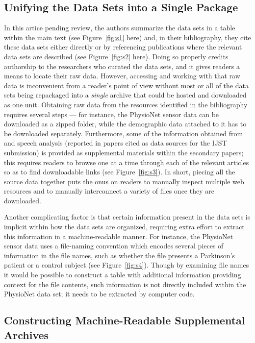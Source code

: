 \documentclass[11pt,letterpaper]{article}
\newcommand{\MRI}{\resizebox{!}{7pt}{\AcronymText{MRI}}}
\newcommand{\textscc}[1]{{\color{orr!35!black}{{%
						\fontfamily{Cabin-TLF}\fontseries{b}\selectfont{\textsc{\scriptsize{#1}}}}}}}
\newcommand{\AcronymText}[1]{{\textscc{#1}}}
\newcommand{\p}[1]{

\vspace{.7em}#1}
\begin{document}
{\subsection{Unifying the Data Sets into a Single Package}  
\p{In this artice pending review, the authors summarize the data sets 
in a table within the main text 
(see Figure~\ref{fig:s1} here) and, in their bibliography, they 
cite these data sets either directly or by 
referencing publications where the relevant data sets are described 
(see Figure~\ref{fig:s2} here).  Doing so properly 
credits authorship to the researchers who curated the data sets, and it gives readers a 
means to locate their raw data.  However, accessing and working with that raw data is 
inconvenient from a reader's point of view without most or all of the data sets being 
repackaged into a \textit{single} archive that could be hosted and downloaded as one unit.  
Obtaining raw data from the resources identified in the bibliography requires 
several steps --- for instance, the PhysioNet sensor data can be downloaded 
as a zipped folder, while the demographic data attached to it has to be downloaded 
separately.  Furthermore, some of the information obtained from \MRI{} and speech analysis 
(reported in papers cited as data sources for the IJST submission) is provided 
as supplemental materials within the secondary papers; this requires readers 
to browse one at a time through each of the relevant articles so as to find 
downloadable links (see Figure~\ref{fig:s3}).  In short, piecing all 
the source data together puts the onus on readers to manually inspect multiple 
web resources and to manually interconnect a variety of files once they are downloaded.}

\p{Another complicating factor is that certain information present in the data sets 
is implicit within how the data sets are organized, requiring extra effort to 
extract this information in a machine-readable manner.  For instance, the PhysioNet 
sensor data uses a file-naming convention which encodes several pieces of 
information in the file names, such as whether the file presents a Parkinson's patient 
or a control subject (see Figure~\ref{fig:s4}).  
Though by examining file names it would be possible to construct a 
table with additional information providing context for the file contents, 
such information is not directly included within the PhysioNet data set; it 
needs to be extracted by computer code.}


\subsection{Constructing Machine-Readable Supplemental Archives}

}
\end{document}
